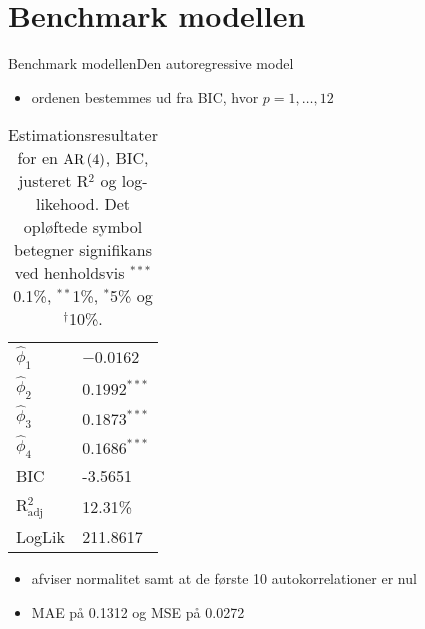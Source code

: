 \section{Benchmark modellen}
\begin{frame}{Benchmark modellen}{Den autoregressive model}
\begin{itemize}
\item ordenen bestemmes ud fra BIC, hvor \(p = 1,\ldots, 12\)
\end{itemize}
\begin{table}[h]
\center
\begin{tabular}{ll}
\toprule
$\widehat{\phi}_1$ &$ -0.0162 $ \\
$\widehat{\phi}_2$ & $0.1992^{***}$  \\
$\widehat{\phi}_3$ &$0.1873^{***}$  \\
$\widehat{\phi}_4$ &$0.1686^{***} $ \\ \midrule
BIC & -3.5651 \\
 R$^2_{\text{adj}}$ & 12.31\% \\
LogLik &  211.8617\\ \bottomrule
 \end{tabular}
\caption{Estimationsresultater for en \(\text{AR} \del{4}\), BIC, justeret R$^2$ og log-likehood. Det opløftede symbol betegner signifikans ved henholdsvis $^{***}$0.1\%, $^{**}$1\%, $^{*}$5\% og $^{\dagger}$10\%.} \label{tab:est_ar}
\end{table}
\begin{itemize}
\item afviser normalitet samt at de første 10 autokorrelationer er nul
\item MAE på 0.1312 og MSE på 0.0272
\end{itemize}
\end{frame}


